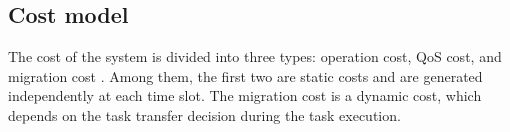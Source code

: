 \subsection{Cost model}
The cost of the system is divided into three types: operation cost, QoS cost, and migration cost \cite{WANG}. Among them, the first two are static costs and are generated independently at each time slot. The migration cost is a dynamic cost, which depends on the task transfer decision during the task execution.